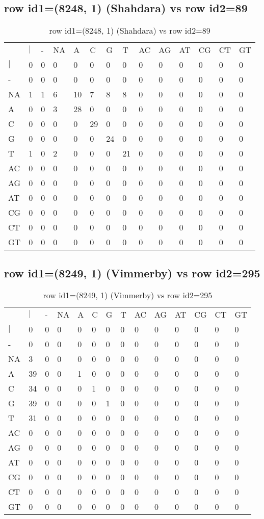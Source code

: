 \subsection{row id1=(8248, 1) (Shahdara) vs row id2=89}
\begin{center}
\begin{longtable}{|l|l|l|l|l|l|l|l|l|l|l|l|l|l|}
\caption{row id1=(8248, 1) (Shahdara) vs row id2=89} \label{table_dm186}\\
\hline
\\
\hline
&$|$&-&NA&A&C&G&T&AC&AG&AT&CG&CT&GT\\
$|$&0&0&0&0&0&0&0&0&0&0&0&0&0\\
-&0&0&0&0&0&0&0&0&0&0&0&0&0\\
NA&1&1&6&10&7&8&8&0&0&0&0&0&0\\
A&0&0&3&28&0&0&0&0&0&0&0&0&0\\
C&0&0&0&0&29&0&0&0&0&0&0&0&0\\
G&0&0&0&0&0&24&0&0&0&0&0&0&0\\
T&1&0&2&0&0&0&21&0&0&0&0&0&0\\
AC&0&0&0&0&0&0&0&0&0&0&0&0&0\\
AG&0&0&0&0&0&0&0&0&0&0&0&0&0\\
AT&0&0&0&0&0&0&0&0&0&0&0&0&0\\
CG&0&0&0&0&0&0&0&0&0&0&0&0&0\\
CT&0&0&0&0&0&0&0&0&0&0&0&0&0\\
GT&0&0&0&0&0&0&0&0&0&0&0&0&0\\
\hline
\end{longtable}
\end{center}

\subsection{row id1=(8249, 1) (Vimmerby) vs row id2=295}
\begin{center}
\begin{longtable}{|l|l|l|l|l|l|l|l|l|l|l|l|l|l|}
\caption{row id1=(8249, 1) (Vimmerby) vs row id2=295} \label{table_dm188}\\
\hline
\\
\hline
&$|$&-&NA&A&C&G&T&AC&AG&AT&CG&CT&GT\\
$|$&0&0&0&0&0&0&0&0&0&0&0&0&0\\
-&0&0&0&0&0&0&0&0&0&0&0&0&0\\
NA&3&0&0&0&0&0&0&0&0&0&0&0&0\\
A&39&0&0&1&0&0&0&0&0&0&0&0&0\\
C&34&0&0&0&1&0&0&0&0&0&0&0&0\\
G&39&0&0&0&0&1&0&0&0&0&0&0&0\\
T&31&0&0&0&0&0&0&0&0&0&0&0&0\\
AC&0&0&0&0&0&0&0&0&0&0&0&0&0\\
AG&0&0&0&0&0&0&0&0&0&0&0&0&0\\
AT&0&0&0&0&0&0&0&0&0&0&0&0&0\\
CG&0&0&0&0&0&0&0&0&0&0&0&0&0\\
CT&0&0&0&0&0&0&0&0&0&0&0&0&0\\
GT&0&0&0&0&0&0&0&0&0&0&0&0&0\\
\hline
\end{longtable}
\end{center}

